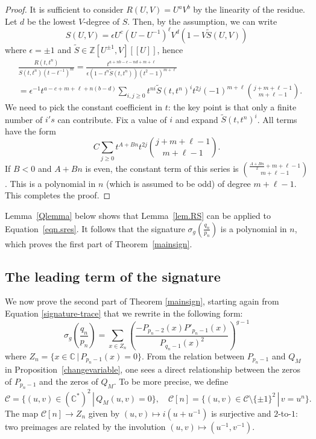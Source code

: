 \documentclass{amsart}
\newcommand{\Z}{\mathbb{Z}}
\newcommand{\C}{\mathbb{C}}
\newcommand{\calC}{\mathcal{C}}
\theoremstyle{definition}
\begin{document}
\begin{proof}
It is sufficient to consider $R(U,V)=U^a V^b$ by the linearity of the residue. Let $d$ be the lowest $V$-degree of $S$. Then, by the assumption, we can write $$S(U,V)=\epsilon U^c(U-U^{-1})^\ell V^d(1-V\tilde{S}(U,V))$$ where $\epsilon=\pm 1$ and $\tilde{S}\in \Z[U^{\pm 1},V][[U]]$, hence 
\begin{align*}
&\frac{R(t,t^n)}{S(t,t^n)(t-t^{-1})^m}=\frac{t^{a+nb-c-nd+m+\ell}}{\epsilon(1-t^n\tilde{S}(t,t^n))(t^2-1)^{m+\ell}}\\
&=\epsilon^{-1} t^{a-c+m+\ell+n(b-d)}\sum_{i,j\ge 0}t^{ni}\tilde{S}(t,t^n)^it^{2j}(-1)^{m+\ell}\binom{j+m+\ell-1}{m+\ell-1}.
\end{align*}
We need to pick the constant coefficient in $t$: the key point is that only a finite number of $i's$ can contribute. Fix a value of $i$ and expand $\tilde{S}(t,t^n)^i$. All terms have the form 
$$C\sum_{j\ge 0}t^{A+Bn}t^{2j}\binom{j+m+\ell-1}{m+\ell-1}.$$
If $B<0$ and $A+Bn$ is even, the constant term of this series is $\binom{\frac{A+Bn}{2}+m+\ell-1}{m+\ell-1}$. This is a polynomial in $n$ (which is assumed to be odd) of degree $m+\ell-1$. This completes the proof.
\end{proof}

Lemma~\ref{Qlemma} below shows that Lemma~\ref{lem.RS} can be applied to Equation~\eqref{eqn.sres}. It follows that the signature $\sigma_g(\frac{q_n}{p_n})$ is a polynomial in $n$, which proves the first part of Theorem~\ref{mainsign}.


\subsection{The leading term of the signature}


We now prove the second part of Theorem \ref{mainsign}, starting again from Equation \eqref{signature-trace} that we rewrite in the following form:
$$\sigma_g \left(\frac{q_n}{p_n}\right)=\sum_{x\in Z_n}\left(\frac{-P_{p_n-2}(x)P'_{p_n-1}(x)}{P_{q_n-1}(x)^2}\right)^{g-1}$$
where $Z_n=\{x\in \C \,|\, P_{p_n-1}(x)=0\}$. From the relation between $P_{p_n-1}$ and $Q_M$ in Proposition~\ref{changevariable}, one sees a direct relationship between the zeros of $P_{p_n-1}$ and the zeros of $Q_M$. To be more precise, we define 
$$\calC=\{(u,v)\in (\C^*)^2 \,|\, Q_M(u,v)=0\},\quad \calC[n]=\{(u,v)\in \calC\setminus \{\pm 1\}^2\,|\, v=u^n\}.$$
The map $\calC[n]\to Z_n$ given by $(u,v)\mapsto i(u+u^{-1})$ is surjective and $2$-to-$1$: two preimages are related by the involution $(u,v)\mapsto(u^{-1},v^{-1})$. 
\end{document}
